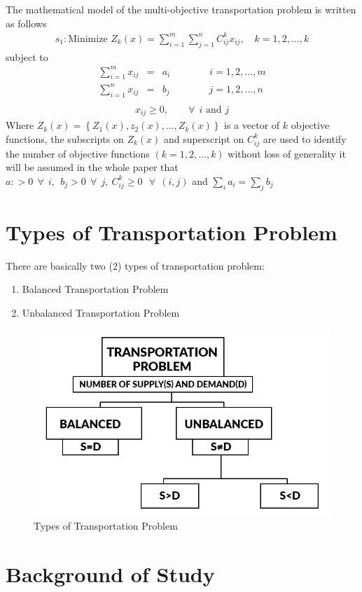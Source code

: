 \documentclass[12pt]{report}
\newcommand{\sps}{\\[0.2cm]}
\newcommand{\NI}{\noindent}
\newcommand{\dsp}{\displaystyle}
\newcommand{\tp}{Transportation Problem }
\newcommand{\stp}{transportation problem }
\begin{document}
	\NI The mathematical model of the multi-objective \stp is written as follows
	\begin{eqnarray}
		s_1: \text{Minimize } Z_k(x) = \sum_{i=1}^{m}\sum_{j=1}^{n}C_{ij}^k x_{ij}, \quad k=1,2,\ldots,k 
	\end{eqnarray}
	subject to
	\begin{eqnarray*}
		\sum_{i=1}^{m}x_{ij} &=& a_i \qquad\qquad i=1,2,\ldots,m\sps
		\sum_{i=1}^{n} x_{ij} &=& b_j \qquad\qquad j=1,2,\ldots,n\\[-1.5cm]
	\end{eqnarray*}
	\begin{gather*}
		x_{ij} \geq 0, \qquad \forall~~ i \text{ and } j
	\end{gather*}
	Where $\dsp Z_k(x) = \left\{Z_1(x), z_2(x),\ldots, Z_k(x)\right\}$ is a vector of $k$ objective functions, the subscripts on $Z_k(x)$ and superscript on $C^k_{ij}$ are used to identify the number of objective functions $(k=1,2,\ldots,k)$ without loss of generality it will be assumed in the whole paper that $\dsp a:>0~~\forall~~ i,~~b_j > 0~~\forall ~~j,~ C_{ij}^k \geq 0 ~~~ \forall~~ (i,j)$ and $\dsp \sum_i a_i = \sum_j b_j$

	\section{Types of Transportation Problem}
	There are basically two (2) types of transportation problem:
	\begin{enumerate}
		\item Balanced \tp\\[-1.1cm]
		\item Unbalanced \tp \\[-1.3cm]
	\end{enumerate}
	\begin{figure}[!h]
		\centering
		\includegraphics[width=0.51\linewidth]{tt4}
		\caption{Types of Transportation Problem}
		\label{fig:1_1}
	\end{figure}
	
	
	\section{Background of Study}
\end{document}
